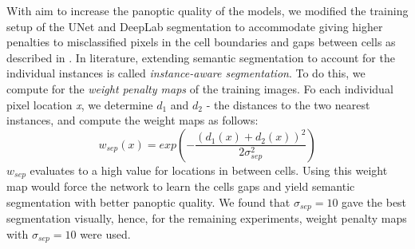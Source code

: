 \documentclass[10pt, journal, compsoc]{IEEEtran}
\begin{document}
With aim to increase the panoptic quality of the models, we modified the training setup of the UNet and DeepLab segmentation to accommodate giving higher penalties to misclassified pixels in the cell boundaries and gaps between cells as described in \cite{nature_unet}. In literature, extending semantic segmentation to account for the individual instances is called \textit{instance-aware segmentation}. To do this, we compute for the \textit{weight penalty maps} of the training images.
Fo each individual pixel location \textit{x}, we determine \textit{$d_1$} and \textit{$d_2$} - the distances to the two nearest instances, and compute the weight maps as follows:
\begin{equation}
w_{sep}(x) = exp\left({-\frac{(d_1(x) + d_2(x))^2}{2\sigma^2_{sep}}}\right)
\end{equation}
$w_{sep}$ evaluates to a high value for locations in between  cells. Using this weight map would force the network to learn the cells gaps and yield semantic segmentation with better panoptic quality. We found that $\sigma_{sep} = 10$ gave the best segmentation visually, hence, for the remaining experiments, weight penalty maps with $\sigma_{sep} = 10$ were used. 
\end{document}
